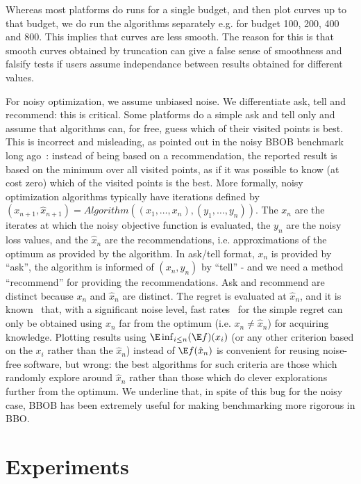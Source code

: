 \documentclass{article}
\begin{document}
Whereas most platforms do runs for a single budget, and then plot curves up to that budget, we do run the algorithms separately e.g. for budget 100, 200, 400 and 800. This implies that curves are less smooth. The reason for this is that smooth curves obtained by truncation can give a false sense of smoothness and falsify tests if users assume independance between results obtained for different values.

For noisy optimization, we assume unbiased noise.
We differentiate ask, tell and recommend: this is critical. Some platforms do a simple ask and tell only and assume that algorithms can, for free, guess which of their visited points is best. This is incorrect and misleading, as pointed out in the noisy BBOB benchmark long ago~: instead of being based on a recommendation, the reported result is based on the minimum  over all visited points, as if it was possible to know (at cost zero) which of the visited points is the best.
More formally, noisy optimization algorithms typically have iterations defined by $(x_{n+1},\hat x_{n+1})=Algorithm((x_1,\dots,x_n),(y_1,\dots,y_n))$. The $x_n$ are the iterates at which the noisy objective function is evaluated, the $y_n$ are the noisy loss values, and the $\hat x_n$ are the recommendations, i.e. approximations of the optimum as provided by the algorithm. In ask/tell format, $x_n$ is provided by ``ask'', the algorithm is informed of $(x_n,y_n)$ by ``tell'' - and we need a method ``recommend'' for providing the recommendations. Ask and recommend are distinct because $x_n$ and $\hat x_n$ are distinct. The regret is evaluated at $\hat x_n$, and it is known~ that, with a significant noise level, fast rates~ for the simple regret can only be obtained using $x_n$ far from the optimum (i.e. $x_n\neq \hat x_n$) for acquiring knowledge. Plotting results using $\E\inf_{i\leq n}(\E f)(x_i)$ (or any other criterion based on the $x_i$ rather than the $\hat x_n$) instead of $\E f(\hat x_n)$ is convenient for reusing noise-free software, but wrong: the best algorithms for such criteria are those which randomly explore around $\hat x_n$ rather than those which do clever explorations further from the optimum. We underline that, in spite of this bug for the noisy case, BBOB has been extremely useful for making benchmarking more rigorous in BBO.
\section{Experiments}
\end{document}
